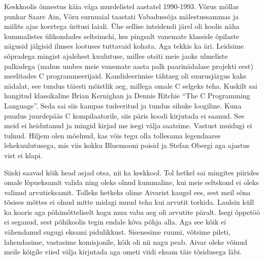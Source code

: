 Keskkoolis õnnestus käia väga murdelistel aastatel 1990-1993. Võrus möllas punkar Saare Ain, Võru surnuaial taastati Vabadussõja mälestussammas ja miilits ajas koertega üritusi laiali. Ühe sellise intsidendi järel oli koolis näha kummalistes ülikondades seltsimehi, kes pingsalt vanemate klasside õpilaste nägusid jälgisid ilmses lootuses tuttavaid kohata. Aga tekkis ka äri. Leidsime sõpradega mingist ajalehest kuulutuse, milles otsiti meie jaoks ulmeliste palkadega (mahus umbes meie vanemate aasta palk paarinädalase projekti eest) meelitades C programmeerijaid. Kandideerimise tähtaeg oli suurusjärgus kaks nädalat, see tundus täiesti mõistlik aeg, millega omale C selgeks teha. Kuskilt sai hangitud klassikaline Brian Kernighan ja Dennis Ritchie \enquote{The C Programming Language}. Seda sai siis kampas tudeeritud ja tundus sihuke loogiline. Kuna puudus juurdepääs C kompilaatorile, siis päris koodi kirjutada ei saanud. See meid ei heidutanud ja mingid kirjad me isegi välja saatsime. Vastust muidugi ei tulnud. Hiljem olen mõelnud, kas võis tegu olla tollesama legendaarse lehekuulutusega, mis viis kokku Bluemooni poisid ja Stefan Obergi aga ajastus vist ei klapi. 

Siiski saavad kõik head asjad otsa, nii ka keskkool. Tol hetkel sai mingites piirides omale lõpueksamit valida ning oleks olnud kummaline, kui meie seltskond ei oleks valinud arvutieksamit. Tolleks hetkeks olime Aivarist kaugel ees, sest meil sõna tõsises mõttes ei olnud mitte midagi muud teha kui arvutit torkida. Laulsin küll ka kooris aga põhimõtteliselt kogu muu vaba aeg oli arvutite päralt. Isegi õppetöö ei seganud, sest põhikoolis tegin endale kõva põhja alla. Aga see kõik ei vähendanud sugugi eksami pidulikkust. Sisenesime ruumi, võtsime pileti, lahendasime, vastasime komisjonile, kõik oli nii nagu peab. Aivar oleks võinud meile kõigile viied välja kirjutada aga ometi viidi eksam täie tõsidusega läbi. 

